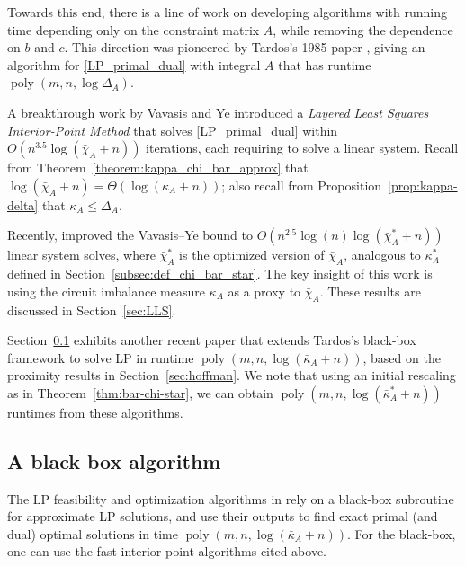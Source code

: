 \documentclass[11pt, a4paper]{article}
\newcommand{\Le}{\kappa}
\newcommand{\1}{\mathbbm{1}}
\newcommand{\poly}{\operatorname{poly}}
\theoremstyle{case}
\begin{document}
Towards this end, there is a line of work on developing algorithms with running time depending only on the constraint matrix $A$, while removing the  dependence on $b$ and $c$. This direction was pioneered by Tardos's 1985 paper \cite{Tardos86}, giving an algorithm for \ref{LP_primal_dual} with integral $A$ that has runtime $\poly(m,n,\log \Delta_A)$.

A breakthrough work by  Vavasis and Ye \cite{Vavasis1996} introduced a \emph{Layered Least Squares Interior-Point Method} that solves \ref{LP_primal_dual} within $O(n^{3.5} \log (\bar \chi_A+n))$ iterations, each requiring to solve a linear system. Recall from Theorem~\ref{theorem:kappa_chi_bar_approx} that $\log (\bar \chi_A+n)=\Theta(\log(\kappa_A+n))$; also recall from  Proposition~\ref{prop:kappa-delta}  that $\kappa_A\le\Delta_A$.

Recently, \cite{DHNV20} improved the Vavasis--Ye bound to  $O(n^{2.5} \log(n) \log (\bar \chi_A^*+n))$ linear system solves, where $\bar \chi_A^*$ is the optimized version of $\bar\chi_A$, analogous to $\kappa^*_A$ defined in Section~\ref{subsec:def_chi_bar_star}. The key insight of this work is using  the circuit imbalance measure $\kappa_A$ as a proxy to $\bar\chi_A$. These results are discussed in Section~\ref{sec:LLS}.

Section~\ref{sec:black-box} exhibits another recent paper \cite{DadushNV20} that extends Tardos's black-box framework  to solve LP in runtime $\poly(m,n,\log (\bar \Le_A+n))$, based on the proximity results in Section~\ref{sec:hoffman}. We note that using an initial rescaling as in Theorem~\ref{thm:bar-chi-star}, we can obtain $\poly(m,n,\log (\bar \Le^*_A+n))$ runtimes from these algorithms.

\subsection{A black box algorithm}\label{sec:black-box}
The LP feasibility and optimization algorithms in \cite{DadushNV20} rely on a black-box subroutine for approximate LP solutions, and use their outputs to find exact primal (and dual) optimal solutions in time $\poly(m,n,\log (\bar \Le_A+n))$. For the black-box, one can use the fast interior-point algorithms cited above.
\end{document}
